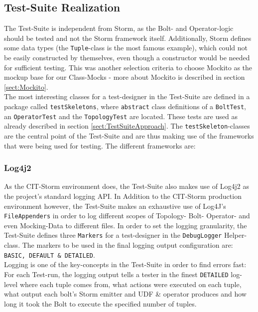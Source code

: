 \subsection{Test-Suite Realization}
\label{sect:TestSuiteRealization}
	The Test-Suite is independent from Storm, as the Bolt- and Operator-logic should be tested and not the Storm framework itself. Additionally, Storm defines some data types (the \texttt{Tuple}-class is the most famous example), which could not be easily constructed by themselves, even though a constructor would be needed for sufficient testing. This was another selection criteria to choose Mockito as the mockup base for our Class-Mocks - more about Mockito is described in section \ref{sect:Mockito}. \\
	The most interesting classes for a test-designer in the Test-Suite are defined in a package called \texttt{testSkeletons}, where \texttt{abstract} class definitions of a \texttt{BoltTest}, an \texttt{OperatorTest} and the \texttt{TopologyTest} are located. These tests are used as already described in section \ref{sect:TestSuiteApproach}.
	The \texttt{testSkeleton}-classes are the central point of the Test-Suite and are thus making use of the frameworks that were being used for testing. The different frameworks are:
	
	\subsubsection{Log4j2}
		As the CIT-Storm environment does, the Test-Suite also makes use of Log4j2 as the project's standard logging API. In Addition to the CIT-Storm production environment however, the Test-Suite makes an exhaustive use of Log4J's \texttt{FileAppenders} in order to log different scopes of Topology- Bolt- Operator- and even Mocking-Data to different files. In order to set the logging granularity, the Test-Suite defines three \texttt{Markers} for a test-designer in the \texttt{DebugLogger} Helper-class. The markers to be used in the final logging output configuration are: \texttt{BASIC, DEFAULT \& DETAILED}.\\
		Logging is one of the key-concepts in the Test-Suite in order to find errors fast: For each Test-run, the logging output tells a tester in the finest \texttt{DETAILED} log-level where each tuple comes from, what actions were executed on each tuple, what output each bolt's Storm emitter and UDF \& operator produces and how long it took the Bolt to execute the specified number of tuples.
	
